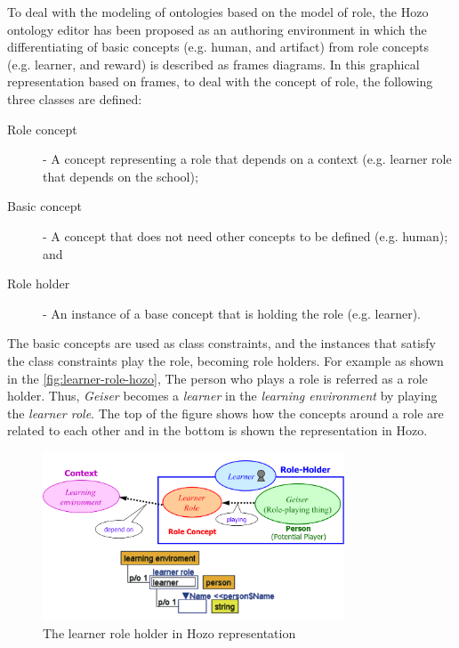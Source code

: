 To deal with the modeling of ontologies based on the model of role, the Hozo ontology editor \cite{KozakiKitamuraIkedaMizoguchi2002} has been proposed as an authoring environment in which the differentiating of basic concepts (e.g. human, and artifact) from role concepts (e.g. learner, and reward) is described as frames diagrams. In this graphical representation based on frames, to deal with the concept of role, the following three classes are defined:

\begin{description}
  \item[Role concept] - A concept representing a role that depends on a context (e.g. learner role that depends on the school);
  \item[Basic concept] - A concept that does not need other concepts to be defined (e.g. human); and
  \item[Role holder] - An instance of a base concept that is holding the role (e.g. learner). 
\end{description}

The basic concepts are used as class constraints, and the instances that satisfy the class constraints play the role, becoming role holders. For example as shown in the \autoref{fig:learner-role-hozo},  The person who plays a role is referred as a role holder. Thus, \emph{Geiser} becomes a \emph{learner} in the \emph{learning environment} by playing the \emph{learner role}. The top of the figure shows how the concepts around a role are related to each other and in the bottom is shown the representation in Hozo.


\begin{figure}[htb]
 \caption{The learner role holder in Hozo representation}
 \label{fig:learner-role-hozo}
 \centering
 \includegraphics[width=0.8\textwidth]{images/chap-general-background/learner-role-hozo.png}
 \fautor
\end{figure}

